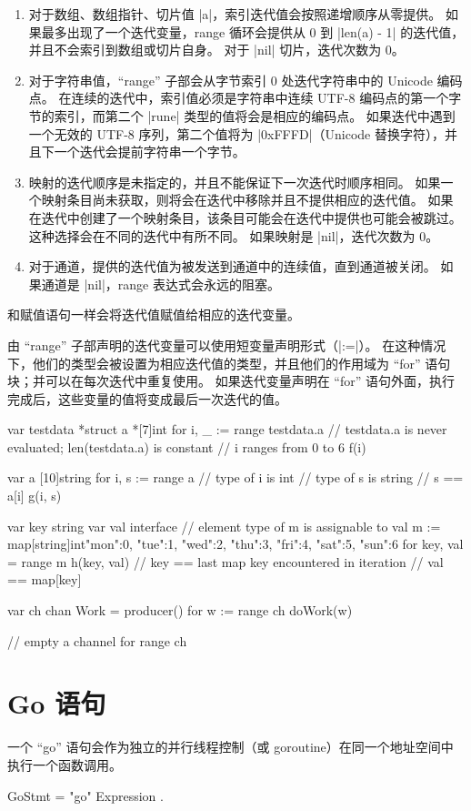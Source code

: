 \begin{enumerate}
\item 对于数组、数组指针、切片值 \code|a|，索引迭代值会按照递增顺序从零提供。
如果最多出现了一个迭代变量，range 循环会提供从 0 到 \code|len(a) - 1| 的迭代值，并且不会索引到数组或切片自身。
对于 \code|nil| 切片，迭代次数为 0。
\item 对于字符串值，``range'' 子部会从字节索引 0 处迭代字符串中的 Unicode 编码点。
在连续的迭代中，索引值必须是字符串中连续 UTF-8 编码点的第一个字节的索引，而第二个 \code|rune| 类型的值将会是相应的编码点。
如果迭代中遇到一个无效的 UTF-8 序列，第二个值将为 \code|0xFFFD|（Unicode 替换字符），并且下一个迭代会提前字符串一个字节。
\item 映射的迭代顺序是未指定的，并且不能保证下一次迭代时顺序相同。
如果一个映射条目尚未获取，则将会在迭代中移除并且不提供相应的迭代值。
如果在迭代中创建了一个映射条目，该条目可能会在迭代中提供也可能会被跳过。
这种选择会在不同的迭代中有所不同。
如果映射是 \code|nil|，迭代次数为 0。
\item 对于通道，提供的迭代值为被发送到通道中的连续值，直到通道被关闭。
如果通道是 \code|nil|，range 表达式会永远的阻塞。
\end{enumerate}

和赋值语句一样会将迭代值赋值给相应的迭代变量。

由 ``range'' 子部声明的迭代变量可以使用短变量声明形式（\code|:=|）。
在这种情况下，他们的类型会被设置为相应迭代值的类型，并且他们的作用域为 ``for'' 语句块；并可以在每次迭代中重复使用。
如果迭代变量声明在 ``for'' 语句外面，执行完成后，这些变量的值将变成最后一次迭代的值。
\begin{golang}
var testdata *struct {
	a *[7]int
}
for i, _ := range testdata.a {
	// testdata.a is never evaluated; len(testdata.a) is constant
	// i ranges from 0 to 6
	f(i)
}

var a [10]string
for i, s := range a {
	// type of i is int
	// type of s is string
	// s == a[i]
	g(i, s)
}

var key string
var val interface {}  // element type of m is assignable to val
m := map[string]int{"mon":0, "tue":1, "wed":2, "thu":3, "fri":4, "sat":5, "sun":6}
for key, val = range m {
	h(key, val)
}
// key == last map key encountered in iteration
// val == map[key]

var ch chan Work = producer()
for w := range ch {
	doWork(w)
}

// empty a channel
for range ch {}
\end{golang}

\section{Go 语句}
一个 ``go'' 语句会作为独立的并行线程控制（或 goroutine）在同一个地址空间中执行一个函数调用。
\begin{EBNF}
GoStmt = "go" Expression .
\end{EBNF}

